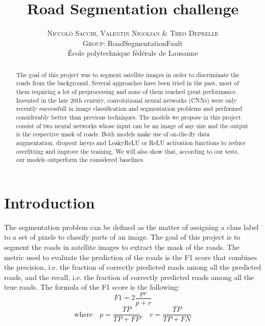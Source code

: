 \documentclass[10pt,conference,compsocconf]{IEEEtran}
\begin{document}
\pretitle{\begin{center}\Huge\bfseries} %
\posttitle{\end{center}} %
\title{Road Segmentation challenge}

\author{
	\textsc{Niccol\`{o} Sacchi, Valentin Nigolian \& Theo Deprelle}
	\normalsize{} \\
	\textsc{Group:}
	\normalsize{RoadSegmentationFault}\\
	\normalsize \'{E}cole polytechnique f\'{e}d\'{e}rale de Lausanne
}

\maketitle

\begin{abstract}
  The goal of this project was to segment satellite images in order to discriminate the roads from the background. Several approaches have been tried in the past, most of them requiring a lot of preprocessing and none of them reached great performance. Invented in the late 20th century, convolutional neural networks (CNNs) were only recently successfull in image classification and segmentation problems and performed considerably better than previous techniques.
  The models we propose in this project consist of two neural networks whose input can be an image of any size and the output is the respective mask of roads. Both models make use of on-the-fly data augmentation, dropout layers and LeakyReLU or ReLU activation functions to reduce overfitting and improve the training. We will also show that, according to our tests, our models outperform the considered baselines.
\end{abstract}

\section{Introduction}
The segmentation problem can be defined as the matter of assigning a class label to a set of pixels to classify parts of an image.
The goal of this project is to segment the roads in satellite images to extract the mask of the roads. The metric used to evaluate the prediction of the roads is the F1 score that combines the precision, i.e. the fraction of correctly predicted roads among all the predicted roads, and the recall, i.e. the fraction of correctly predicted roads among all the true roads. The formula of the F1 score is the following:
$$F1=2\frac{pr}{p+r}$$ $$\textrm{where} \quad p=\frac{TP}{TP+FP} \textrm{,} \quad r=\frac{TP}{TP+FN}$$
\end{document}
